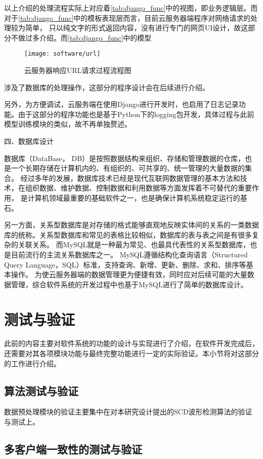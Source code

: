 以上介绍的处理流程实际上对应着\autoref{tab:django_func}中的视图，即业务逻辑层。而对于\autoref{tab:django_func}中的模板表现层而言，目前云服务器端程序对网络请求的处理较为简单，
只以纯文字的形式返回内容，没有进行专门的网页UI设计，故这部分不做过多介绍。而\autoref{tab:django_func}中的模型
\begin{figure}[h]
    \centering
    \texttt{[image: software/url]}
    \caption{\label{fig:url}云服务器响应URL请求过程流程图}
\end{figure}

\noindent
涉及了数据库的处理操作，这部分的程序设计会在后续进行介绍。

另外，为方便调试，云服务端在使用Django进行开发时，也启用了日志记录功能。由于这部分的程序功能也是基于Python下的logging包开发，具体过程与此前模型训练模块的类似，故不再单独赘述。

四、数据库设计

数据库（DataBase， DB）是按照数据结构来组织、存储和管理数据的仓库，也是一个长期存储在计算机内的、有组织的、可共享的、统一管理的大量数据的集合。
经过多年的发展，数据库技术已经是现代互联网数据管理的基本方法和技术，在组织数据、维护数据、控制数据和利用数据等方面发挥着不可替代的重要作用，
是计算机领域最重要的基础软件之一，也是确保计算机系统稳定运行的基石。

另一方面，关系型数据库是对存储的格式能够直观地反映实体间的关系的一类数据库的统称。关系型数据库和常见的表格比较相似，数据库的表与表之间是有很多复杂的关联关系。
而MySQL就是一种最为常见、也最具代表性的关系型数据库，也是目前流行的主流关系数据库之一。
MySQL遵循结构化查询语言（Structured Query Language，SQL）标准，支持查询、新增、更新、删除、求和、排序等基本操作。
为使云服务器端的数据管理更为便捷有效，同时应对后续可能的大量数据管理，综合软件系统的开发过程中也基于MySQL进行了简单的数据库设计。


\section{测试与验证}
此前的内容主要对软件系统的功能的设计与实现进行了介绍，在软件开发完成后，还需要对其各项模块功能与最终完整功能进行一定的实际验证。本小节将对这部分的工作进行介绍。

\subsection{算法测试与验证}
数据预处理模块的验证主要集中在对本研究设计提出的SCD波形检测算法的验证与测试上。

\subsection{多客户端一致性的测试与验证}


